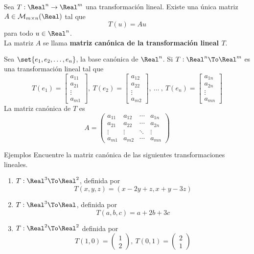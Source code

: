 \begin{frame}
  \begin{thm}
    Sea $T:\Real^n\to\Real^m$ una transformación lineal. Existe una única matriz $A\in\mathcal{M}_{m\times n}(\Real)$ tal que
    $$T(u)=Au$$
    para todo $u\in\Real^n$.\\
    La matriz $A$ se llama \textnormal{\textbf{matriz canónica de la transformación lineal $T$}}.
  \end{thm}
\end{frame}

\begin{frame}
  Sea $\set{e_1,e_2,\ldots,e_n}$, la base canónica de $\Real^n$. Si $T:\Real^n\To\Real^m$ es una transformación lineal tal que 
  $$T(e_1)=\left[\begin{array}{r}a_{11}\\a_{21}\\\vdots\\a_{m1}\end{array}\right],\ T(e_2)=\left[\begin{array}{r}a_{12}\\a_{22}\\\vdots\\a_{m2}\end{array}\right],\ \ldots\ ,\ T(e_n)=\left[\begin{array}{r}a_{1n}\\a_{2n}\\\vdots\\a_{mn}\end{array}\right]$$
  La matriz canónica de $T$ es
  $$A=\left(\begin{array}{rrcr}
  a_{11} & a_{12} & \cdots & a_{1n}\\
  a_{21} & a_{22} & \cdots & a_{2n}\\
  \vdots & \vdots & \ddots & \vdots\\
  a_{m1} & a_{m2} & \cdots & a_{mn}
  \end{array}\right)$$
\end{frame}

\begin{frame}{Ejemplos}
  Encuentre la matriz canónica de las siguientes transformaciones lineales.
  \begin{enumerate}
    \item $T:\Real^3\To \Real^2$, definida por 
    $$T(x,y,z)=(x-2y+z,x+y-3z)$$
    \item $T:\Real^3\To \Real$, definida por 
    $$T(a,b,c)=a+2b+3c$$
    \item $T:\Real^2\To\Real^2$ definida por
    $$T(1,0)=\left(\begin{array}{r}1\\2\end{array}\right),\ T(0,1)=\left(\begin{array}{r}2\\1\end{array}\right)$$
  \end{enumerate}
\end{frame}

